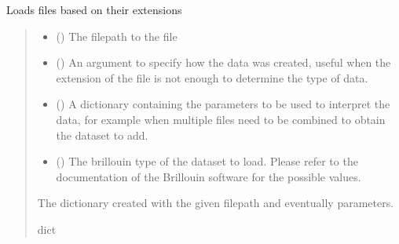 \documentclass[letterpaper,10pt,english]{sphinxmanual}
\begin{document}

\begin{fulllineitems}
\label{\detokenize{source/_autosummary/HDF5_BLS.load_data:HDF5_BLS.load_data.load_general}}
\pysigstartsignatures
\pysiglinewithargsret
{}
{\sphinxparamcomma {}\sphinxparamcomma {}\sphinxparamcomma {}}
{}
\pysigstopsignatures
\sphinxAtStartPar
Loads files based on their extensions
\begin{quote}\begin{description}
\begin{itemize}
\item {} 
\sphinxAtStartPar
{} () \textendash{} The filepath to the file

\item {} 
\sphinxAtStartPar
{} () \textendash{} An argument to specify how the data was created, useful when the extension of the file is not enough to determine the type of data.

\item {} 
\sphinxAtStartPar
{} () \textendash{} A dictionary containing the parameters to be used to interpret the data, for example when multiple files need to be combined to obtain the dataset to add.

\item {} 
\sphinxAtStartPar
{} () \textendash{} The brillouin type of the dataset to load. Please refer to the documentation of the Brillouin software for the possible values.

\end{itemize}

\sphinxAtStartPar
The dictionary created with the given filepath and eventually parameters.

\sphinxAtStartPar
dict

\end{description}\end{quote}

\end{fulllineitems}
\end{document}
